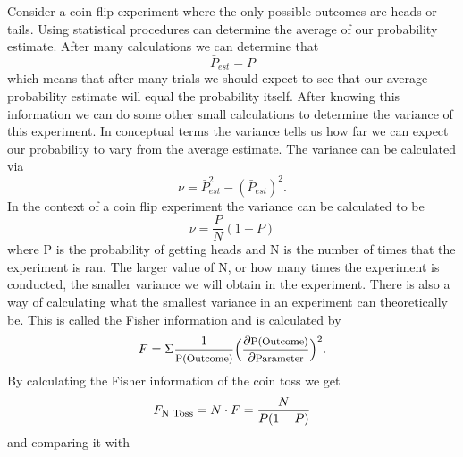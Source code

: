 \documentclass[twocolumn]{article}
\begin{document}
Consider a coin flip experiment where the only possible outcomes are heads or tails. Using statistical procedures can determine the average of our probability estimate. After many calculations we can determine that
\begin{equation}
\bar{P}_{est}=P
\end{equation}
which means that after many trials we should expect to see that our average probability estimate will equal the probability itself. After knowing this information we can do some other small calculations to determine the variance of this experiment. In conceptual terms the variance tells us how far we can expect our probability to vary from the average estimate. The variance can be calculated via
\begin{equation}
\nu=\bar{P}^2_{est}-(\bar{P}_{est})^2.
\end{equation}
In the context of a coin flip experiment the variance can be calculated to be
\begin{equation}
\nu=\frac{P}{N}(1-P)
\end{equation}
where P is the probability of getting heads and N is the number of times that the experiment is ran. The larger value of N, or how many times the experiment is conducted, the smaller variance we will obtain in the experiment. There is also a way of calculating what the smallest variance in an experiment can theoretically be. This is called the Fisher information and is calculated by
\begin{equation}
F=\Sigma\frac{1}{\text{\footnotesize{P(Outcome)}}}\Big(\frac{\partial \text{\footnotesize{P(Outcome)}}}{\partial\text{\footnotesize{Parameter}}}\Big)^2.
\end{equation}
By calculating the Fisher information of the coin toss we get
\begin{equation}
F_{\text{\footnotesize{N Toss}}}=N\cdot F=\frac{N}{P(1-P)}
\end{equation}
and comparing it with
\end{document}
